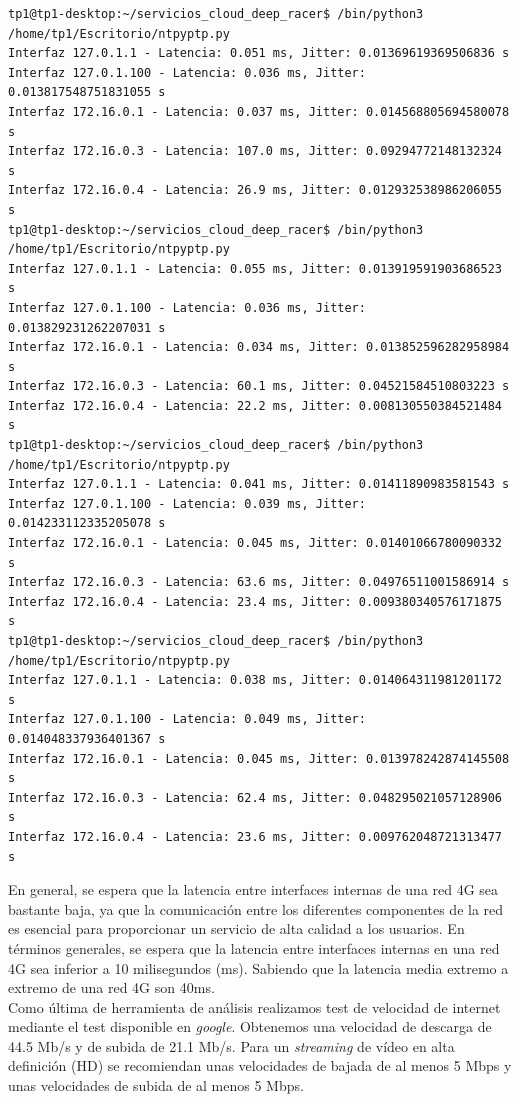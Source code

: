 \begin{lstlisting}
tp1@tp1-desktop:~/servicios_cloud_deep_racer$ /bin/python3 /home/tp1/Escritorio/ntpyptp.py
Interfaz 127.0.1.1 - Latencia: 0.051 ms, Jitter: 0.01369619369506836 s
Interfaz 127.0.1.100 - Latencia: 0.036 ms, Jitter: 0.013817548751831055 s
Interfaz 172.16.0.1 - Latencia: 0.037 ms, Jitter: 0.014568805694580078 s
Interfaz 172.16.0.3 - Latencia: 107.0 ms, Jitter: 0.09294772148132324 s
Interfaz 172.16.0.4 - Latencia: 26.9 ms, Jitter: 0.012932538986206055 s
tp1@tp1-desktop:~/servicios_cloud_deep_racer$ /bin/python3 /home/tp1/Escritorio/ntpyptp.py
Interfaz 127.0.1.1 - Latencia: 0.055 ms, Jitter: 0.013919591903686523 s
Interfaz 127.0.1.100 - Latencia: 0.036 ms, Jitter: 0.013829231262207031 s
Interfaz 172.16.0.1 - Latencia: 0.034 ms, Jitter: 0.013852596282958984 s
Interfaz 172.16.0.3 - Latencia: 60.1 ms, Jitter: 0.04521584510803223 s
Interfaz 172.16.0.4 - Latencia: 22.2 ms, Jitter: 0.008130550384521484 s
tp1@tp1-desktop:~/servicios_cloud_deep_racer$ /bin/python3 /home/tp1/Escritorio/ntpyptp.py
Interfaz 127.0.1.1 - Latencia: 0.041 ms, Jitter: 0.01411890983581543 s
Interfaz 127.0.1.100 - Latencia: 0.039 ms, Jitter: 0.014233112335205078 s
Interfaz 172.16.0.1 - Latencia: 0.045 ms, Jitter: 0.01401066780090332 s
Interfaz 172.16.0.3 - Latencia: 63.6 ms, Jitter: 0.04976511001586914 s
Interfaz 172.16.0.4 - Latencia: 23.4 ms, Jitter: 0.009380340576171875 s
tp1@tp1-desktop:~/servicios_cloud_deep_racer$ /bin/python3 /home/tp1/Escritorio/ntpyptp.py
Interfaz 127.0.1.1 - Latencia: 0.038 ms, Jitter: 0.014064311981201172 s
Interfaz 127.0.1.100 - Latencia: 0.049 ms, Jitter: 0.014048337936401367 s
Interfaz 172.16.0.1 - Latencia: 0.045 ms, Jitter: 0.013978242874145508 s
Interfaz 172.16.0.3 - Latencia: 62.4 ms, Jitter: 0.048295021057128906 s
Interfaz 172.16.0.4 - Latencia: 23.6 ms, Jitter: 0.009762048721313477 s

\end{lstlisting}

En general, se espera que la latencia entre interfaces internas de una red 4G sea bastante baja, ya que la comunicación entre los diferentes componentes de la red es esencial para proporcionar un servicio de alta calidad a los usuarios. En términos generales, se espera que la latencia entre interfaces internas en una red 4G sea inferior a 10 milisegundos (ms). Sabiendo que la latencia media extremo a extremo de una red 4G son 40ms.\\

Como última de herramienta de análisis realizamos test de velocidad de internet mediante el test disponible en \textit{google}.
Obtenemos una velocidad de descarga de 44.5 Mb/s y de subida de 21.1 Mb/s. Para un \textit{streaming} de vídeo en alta definición (HD) se recomiendan unas velocidades de bajada de al menos 5 Mbps y unas velocidades de subida de al menos 5 Mbps.


